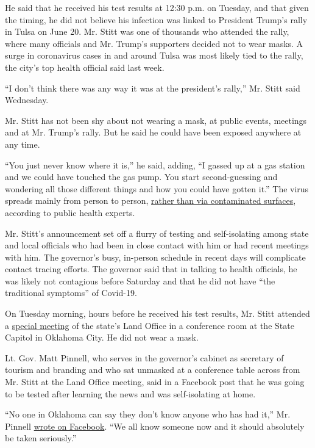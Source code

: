 He said that he received his test results at 12:30 p.m. on Tuesday, and
that given the timing, he did not believe his infection was linked to
President Trump's rally in Tulsa on June 20. Mr. Stitt was one of
thousands who attended the rally, where many officials and Mr. Trump's
supporters decided not to wear masks. A surge in coronavirus cases in
and around Tulsa was most likely tied to the rally, the city's top
health official said last week.

``I don't think there was any way it was at the president's rally,'' Mr.
Stitt said Wednesday.

Mr. Stitt has not been shy about not wearing a mask, at public events,
meetings and at Mr. Trump's rally. But he said he could have been
exposed anywhere at any time.

``You just never know where it is,'' he said, adding, ``I gassed up at a
gas station and we could have touched the gas pump. You start
second-guessing and wondering all those different things and how you
could have gotten it.'' The virus spreads mainly from person to person,
\href{https://www.nytimes.com/2020/05/22/health/cdc-coronavirus-touching-surfaces.html}{rather
than via contaminated surfaces}, according to public health experts.

Mr. Stitt's announcement set off a flurry of testing and self-isolating
among state and local officials who had been in close contact with him
or had recent meetings with him. The governor's busy, in-person schedule
in recent days will complicate contact tracing efforts. The governor
said that in talking to health officials, he was likely not contagious
before Saturday and that he did not have ``the traditional symptoms'' of
Covid-19.

On Tuesday morning, hours before he received his test results, Mr. Stitt
attended a
\href{https://tulsaworld.com/news/local/oklahoma-watch-gov-stitt-lashes-out-as-pick-to-run-land-office-is-approved-in/article_677a77e8-9b90-5344-8ad9-d3268fb1fb03.html}{special
meeting} of the state's Land Office in a conference room at the State
Capitol in Oklahoma City. He did not wear a mask.

Lt. Gov. Matt Pinnell, who serves in the governor's cabinet as secretary
of tourism and branding and who sat unmasked at a conference table
across from Mr. Stitt at the Land Office meeting, said in a Facebook
post that he was going to be tested after learning the news and was
self-isolating at home.

``No one in Oklahoma can say they don't know anyone who has had it,''
Mr. Pinnell
\href{https://www.facebook.com/matt.pinnell.5/posts/10223594197268150}{wrote
on Facebook}. ``We all know someone now and it should absolutely be
taken seriously.''

